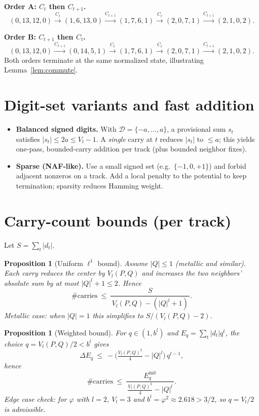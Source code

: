\documentclass[11pt]{article}
\newtheorem{proposition}[theorem]{Proposition}
\theoremstyle{definition}
\theoremstyle{remark}
\begin{document}
\noindent\textbf{Order A: $C_t$ then $C_{t+1}$.}
\[
(0,13,12,0)\xrightarrow{C_t}(1,6,13,0)\xrightarrow{C_{t+1}}(1,7,6,1)
\xrightarrow{C_t}(2,0,7,1)\xrightarrow{C_{t+1}}(2,1,0,2).
\]

\noindent\textbf{Order B: $C_{t+1}$ then $C_t$.}
\[
(0,13,12,0)\xrightarrow{C_{t+1}}(0,14,5,1)\xrightarrow{C_t}(1,7,6,1)
\xrightarrow{C_t}(2,0,7,1)\xrightarrow{C_{t+1}}(2,1,0,2).
\]
Both orders terminate at the same normalized state, illustrating Lemma~\ref{lem:commute}.

\section{Digit-set variants and fast addition}\label{sec:digits-fast}
\begin{itemize}
\item \textbf{Balanced signed digits.} With $\mathcal D=\{-a,\dots,a\}$, a provisional sum $s_t$ satisfies $|s_t|\le 2a\le V_l-1$. A \emph{single} carry at $t$ reduces $|s_t|$ to $\le a$; this yields one-pass, bounded-carry addition per track (plus bounded neighbor fixes).
\item \textbf{Sparse (NAF-like).} Use a small signed set (e.g.\ $\{-1,0,+1\}$) and forbid adjacent nonzeros on a track. Add a local penalty to the potential to keep termination; sparsity reduces Hamming weight.
\end{itemize}

\section{Carry-count bounds (per track)}\label{sec:bounds}
Let $S=\sum_t |d_t|$.

\begin{proposition}[Uniform $\ell^1$ bound]
Assume $|Q|\le 1$ (metallic and similar). Each carry reduces the center by $V_l(P,Q)$ and increases the two neighbors' absolute sum by at most $|Q|^{l}+1\le 2$. Hence
\[
\#\mathrm{carries}\ \le\ \frac{S}{\,V_l(P,Q) - (|Q|^{l}+1)\,}.
\]
\emph{Metallic case:} when $|Q|=1$ this simplifies to $S/(V_l(P,Q)-2)$.
\end{proposition}

\begin{proposition}[Weighted bound]
For $q\in(1,b^l)$ and $E_q=\sum_t |d_t|q^t$, the choice $q=V_l(P,Q)/2<b^l$ gives
\[
\Delta E_q\ \le\ -\Big(\tfrac{V_l(P,Q)^2}{4}-|Q|^{l}\Big)\,q^{t-1},
\]
hence
\[
\#\mathrm{carries}\ \le\ \frac{E_q^{\mathrm{init}}}{\,\tfrac{V_l(P,Q)^2}{4}-|Q|^{l}\,}.
\]
\emph{Edge case check:} for $\varphi$ with $l=2$, $V_l=3$ and $b^l=\varphi^2\approx 2.618>3/2$, so $q=V_l/2$ is admissible.
\end{proposition}
\end{document}
